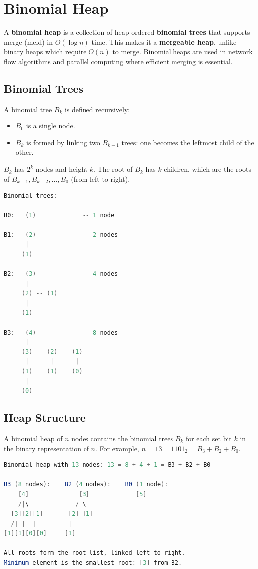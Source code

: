 \section{Binomial Heap}

A \textbf{binomial heap} is a collection of heap-ordered \textbf{binomial trees} that supports merge (meld) in $O(\log n)$ time. This makes it a \textbf{mergeable heap}, unlike binary heaps which require $O(n)$ to merge. Binomial heaps are used in network flow algorithms and parallel computing where efficient merging is essential.

\subsection{Binomial Trees}

A binomial tree $B_k$ is defined recursively:
\begin{itemize}
\item $B_0$ is a single node.
\item $B_k$ is formed by linking two $B_{k-1}$ trees: one becomes the leftmost child of the other.
\end{itemize}

$B_k$ has $2^k$ nodes and height $k$. The root of $B_k$ has $k$ children, which are the roots of $B_{k-1}, B_{k-2}, \ldots, B_0$ (from left to right).

\begin{lstlisting}[language=Java]
Binomial trees:

B0:   (1)             -- 1 node

B1:   (2)             -- 2 nodes
      |
     (1)

B2:   (3)             -- 4 nodes
      |
     (2) -- (1)
      |
     (1)

B3:   (4)             -- 8 nodes
      |
     (3) -- (2) -- (1)
      |      |      |
     (1)    (1)    (0)
      |
     (0)
\end{lstlisting}

\subsection{Heap Structure}

A binomial heap of $n$ nodes contains the binomial trees $B_k$ for each set bit $k$ in the binary representation of $n$. For example, $n = 13 = 1101_2 = B_3 + B_2 + B_0$.

\begin{lstlisting}[language=Java]
Binomial heap with 13 nodes: 13 = 8 + 4 + 1 = B3 + B2 + B0

B3 (8 nodes):    B2 (4 nodes):    B0 (1 node):
    [4]              [3]             [5]
    /|\             / \
  [3][2][1]       [2] [1]
  /| |  |         |
[1][1][0][0]     [1]

All roots form the root list, linked left-to-right.
Minimum element is the smallest root: [3] from B2.
\end{lstlisting}

